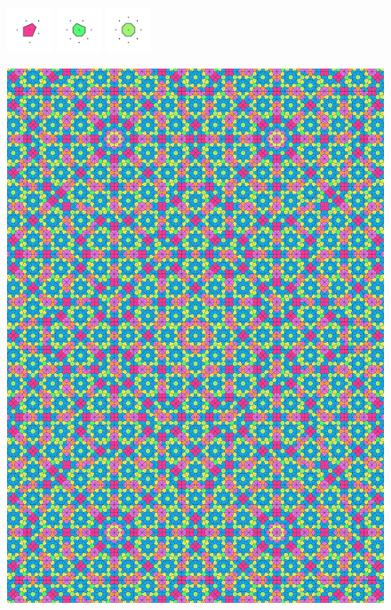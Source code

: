\documentclass[text.tex]{subfiles}
\begin{document}
\begin{figure}[h!]
\includegraphics[width=0.12\textwidth]{img/results/octagon/octagon_160355_(4_1alpha_4)_005.pdf}
\includegraphics[width=0.12\textwidth]{img/results/octagon/octagon_160355_(4_1alpha_4)_006.pdf}
\includegraphics[width=0.12\textwidth]{img/results/octagon/octagon_160355_(4_1alpha_4)_007.pdf}
\end{figure}

\begin{figure}[h!]
\centering
\includegraphics[width=1\textwidth]{img/results/octagon/quasi_polygon-octagon_160355_(4_1alpha_4).pdf}
\end{figure}
\end{document}

